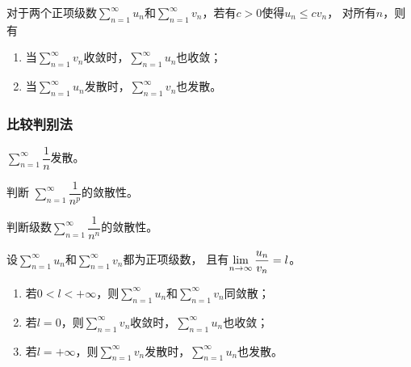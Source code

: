 \documentclass[14pt,notheorems,leqno,xcolor={rgb}]{beamer} %
\begin{document}

\begin{frame}
\begin{theorem}[比较判别法]
对于两个正项级数$\sum\limits_{n=1}^{\infty}u_n$和$\sum\limits_{n=1}^{\infty}v_n$，若有$c>0$使得$u_n\le cv_n$，
对所有$n$，则有
\begin{enumerate}
  \item 当$\sum\limits_{n=1}^{\infty}v_n$收敛时，$\sum\limits_{n=1}^{\infty}u_n$也收敛；
  \item 当$\sum\limits_{n=1}^{\infty}u_n$发散时，$\sum\limits_{n=1}^{\infty}v_n$也发散。
\end{enumerate}
\end{theorem}
\end{frame}

\begin{frame}
\frametitle{比较判别法}
\begin{example}
 $\sum\limits_{n=1}^{\infty}\dfrac1n$发散。
\end{example}
\vpause
\begin{example}
判断  $\sum\limits_{n=1}^{\infty}\dfrac1{n^p}$的敛散性。
\end{example}
\vpause
\begin{example}
判断级数$\sum\limits_{n=1}^{\infty}\dfrac1{n^n}$的敛散性。
\end{example}
\end{frame}

\begin{frame}
\begin{theorem}[比较判别法]
设$\sum\limits_{n=1}^{\infty}u_n$和$\sum\limits_{n=1}^{\infty}v_n$都为正项级数，
且有$\lim\limits_{n\to\infty}\dfrac{u_n}{v_n}=l$。
\begin{enumerate}[<+->]
  \item 若$0<l<+\infty$，则$\sum\limits_{n=1}^{\infty}u_n$和$\sum\limits_{n=1}^{\infty}v_n$同敛散；
  \item 若$l=0$，则$\sum\limits_{n=1}^{\infty}v_n$收敛时，$\sum\limits_{n=1}^{\infty}u_n$也收敛；
  \item 若$l=+\infty$，则$\sum\limits_{n=1}^{\infty}v_n$发散时，$\sum\limits_{n=1}^{\infty}u_n$也发散。
\end{enumerate}
\end{theorem}
\end{frame}
\end{document}
